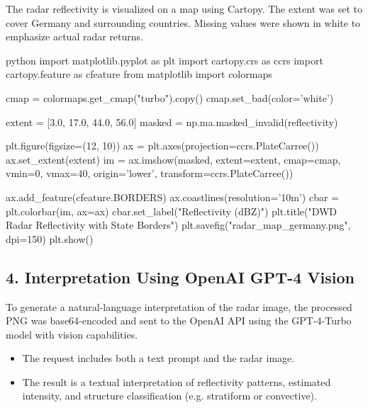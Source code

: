 The radar reflectivity is  visualized on a map using Cartopy. The extent was set to cover Germany and surrounding countries. Missing values were shown in white to emphasize actual radar returns.

\begin{codeonly}{python}
import matplotlib.pyplot as plt
import cartopy.crs as ccrs
import cartopy.feature as cfeature
from matplotlib import colormaps

cmap = colormaps.get_cmap("turbo").copy()
cmap.set_bad(color='white')

extent = [3.0, 17.0, 44.0, 56.0]
masked = np.ma.masked_invalid(reflectivity)

plt.figure(figsize=(12, 10))
ax = plt.axes(projection=ccrs.PlateCarree())
ax.set_extent(extent)
im = ax.imshow(masked, extent=extent, cmap=cmap, vmin=0, vmax=40,
               origin='lower', transform=ccrs.PlateCarree())

ax.add_feature(cfeature.BORDERS)
ax.coastlines(resolution='10m')
cbar = plt.colorbar(im, ax=ax)
cbar.set_label("Reflectivity (dBZ)")
plt.title("DWD Radar Reflectivity with State Borders")
plt.savefig("radar_map_germany.png", dpi=150)
plt.show()
\end{codeonly}

%
\subsection{4. Interpretation Using OpenAI GPT-4 Vision}

To generate a natural-language interpretation of the radar image, the processed PNG was base64-encoded and sent to the OpenAI API using the GPT-4-Turbo model with vision capabilities.

\begin{itemize}
  \item The request includes both a text prompt and the radar image.
  \item The result is a textual interpretation of reflectivity patterns, estimated intensity, and structure classification (e.g. stratiform or convective).
\end{itemize}

